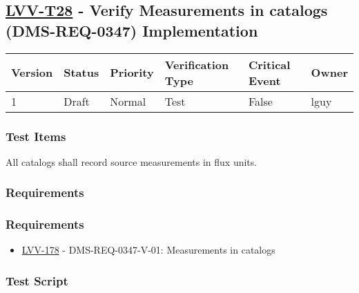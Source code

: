 \hypertarget{lvv-t28---verify-measurements-in-catalogs-dms-req-0347-implementation}{%
\subsection{\texorpdfstring{\href{https://jira.lsstcorp.org/secure/Tests.jspa\#/testCase/LVV-T28}{LVV-T28}
- Verify Measurements in catalogs (DMS-REQ-0347)
Implementation}{LVV-T28 - Verify Measurements in catalogs (DMS-REQ-0347) Implementation}}\label{lvv-t28---verify-measurements-in-catalogs-dms-req-0347-implementation}}

\begin{longtable}[]{@{}llllll@{}}
\toprule
Version & Status & Priority & Verification Type & Critical Event &
Owner\tabularnewline
\midrule
\endhead
1 & Draft & Normal & Test & False & lguy\tabularnewline
\bottomrule
\end{longtable}

\hypertarget{test-items-22}{%
\subsubsection{Test Items}\label{test-items-22}}

All catalogs shall record source measurements in flux units.

\hypertarget{requirements-44}{%
\subsubsection{Requirements}\label{requirements-44}}

\hypertarget{requirements-45}{%
\subsubsection{Requirements}\label{requirements-45}}

\begin{itemize}
\tightlist
\item
  \href{https://jira.lsstcorp.org/browse/LVV-178}{LVV-178} -
  DMS-REQ-0347-V-01: Measurements in catalogs
\end{itemize}

\hypertarget{test-script-22}{%
\subsubsection{Test Script}\label{test-script-22}}

